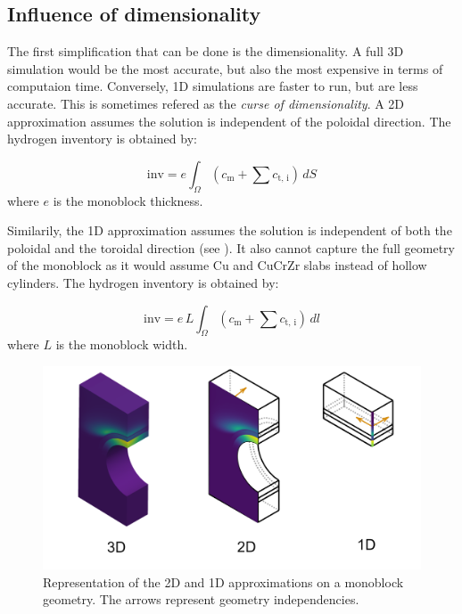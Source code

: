 \subsection{Influence of dimensionality}

The first simplification that can be done is the dimensionality.
A full 3D simulation would be the most accurate, but also the most expensive in terms of computaion time.
Conversely, 1D simulations are faster to run, but are less accurate.
This is sometimes refered as the \textit{curse of dimensionality}.
A 2D approximation assumes the solution is independent of the poloidal direction.
The hydrogen inventory is obtained by:

\begin{equation}
    \mathrm{inv} = e \int_\Omega (c_\mathrm{m} + \sum c_\mathrm{t,\, i}) \, dS
\end{equation}
where $e$ is the monoblock thickness.

Similarily, the 1D approximation assumes the solution is independent of both the poloidal and the toroidal direction (see ).
It also cannot capture the full geometry of the monoblock as it would assume Cu and CuCrZr slabs instead of hollow cylinders.
The hydrogen inventory is obtained by:

\begin{equation}
    \mathrm{inv} = e \, L \int_\Omega (c_\mathrm{m} + \sum c_\mathrm{t,\, i}) \, dl
\end{equation}
where $L$ is the monoblock width.

\begin{figure}
    \centering
    \includegraphics[width=\linewidth]{Figures/Chapter3/monoblocks/dimension_approximation.png}
    \caption{Representation of the 2D and 1D approximations on a monoblock geometry. The arrows represent geometry independencies.}
\end{figure}

